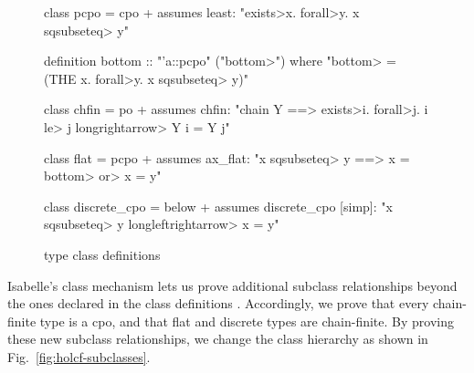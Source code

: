 \begin{figure}
\begin{isacode}
\end{isacode}
\unmedskip
{}
\begin{isacode}
class pcpo = cpo +
  assumes least: "\<exists>x. \<forall>y. x \<sqsubseteq> y"
\end{isacode}
\unmedskip
{}
\begin{isacode}
definition bottom :: "'a::pcpo"  ("\<bottom>")
  where "\<bottom> = (THE x. \<forall>y. x \<sqsubseteq> y)"
\end{isacode}
\unmedskip

\begin{isacode}
class chfin = po +
  assumes chfin: "chain Y ==> \<exists>i. \<forall>j. i \<le> j \<longrightarrow> Y i = Y j"
\end{isacode}
\unmedskip
{}
\begin{isacode}
class flat = pcpo +
  assumes ax_flat: "x \<sqsubseteq> y ==> x = \<bottom> \<or> x = y"
\end{isacode}
\unmedskip
{}
\begin{isacode}
class discrete_cpo = below +
  assumes discrete_cpo [simp]: "x \<sqsubseteq> y \<longleftrightarrow> x = y"
\end{isacode}
\caption{ type class definitions}
\label{fig:holcf-classes}
\end{figure}

Isabelle's class mechanism lets us prove additional subclass relationships beyond the ones declared in the class definitions \cite[\S3.5]{isabelle-classes}. Accordingly, we prove that every chain-finite type is a cpo, and that flat and discrete types are chain-finite. By proving these new subclass relationships, we change the class hierarchy as shown in Fig.~\ref{fig:holcf-subclasses}.

